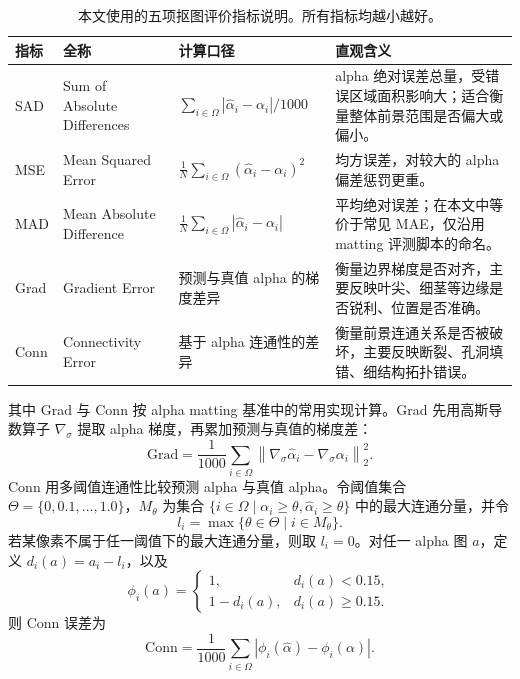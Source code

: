 \documentclass[supercite]{HustGraduPaper}
\begin{document}
	\begin{table}[ht]
		\centering
		\caption{本文使用的五项抠图评价指标说明。所有指标均越小越好。}
		\label{tab:metric_defs}
		\small
		\begin{tabularx}{\linewidth}{@{}llXX@{}}
			\toprule
			指标 & 全称 & 计算口径 & 直观含义 \\
			\midrule
			SAD & Sum of Absolute Differences & $\sum_{i\in\Omega}|\hat{\alpha}_i-\alpha_i|/1000$ & alpha 绝对误差总量，受错误区域面积影响大；适合衡量整体前景范围是否偏大或偏小。 \\
			MSE & Mean Squared Error & $\frac{1}{N}\sum_{i\in\Omega}(\hat{\alpha}_i-\alpha_i)^2$ & 均方误差，对较大的 alpha 偏差惩罚更重。 \\
			MAD & Mean Absolute Difference & $\frac{1}{N}\sum_{i\in\Omega}|\hat{\alpha}_i-\alpha_i|$ & 平均绝对误差；在本文中等价于常见 MAE，仅沿用 matting 评测脚本的命名。 \\
			Grad & Gradient Error & 预测与真值 alpha 的梯度差异 & 衡量边界梯度是否对齐，主要反映叶尖、细茎等边缘是否锐利、位置是否准确。 \\
			Conn & Connectivity Error & 基于 alpha 连通性的差异 & 衡量前景连通关系是否被破坏，主要反映断裂、孔洞填错、细结构拓扑错误。 \\
			\bottomrule
		\end{tabularx}
	\end{table}

	其中 Grad 与 Conn 按 alpha matting 基准中的常用实现计算。Grad 先用高斯导数算子 $\nabla_\sigma$ 提取 alpha 梯度，再累加预测与真值的梯度差：
	\begin{equation}
		\mathrm{Grad}=\frac{1}{1000}\sum_{i\in\Omega}
		\left\|\nabla_\sigma\hat{\alpha}_i-\nabla_\sigma\alpha_i\right\|_2^2 .
	\end{equation}
	Conn 用多阈值连通性比较预测 alpha 与真值 alpha。令阈值集合 $\Theta=\{0,0.1,\ldots,1.0\}$，$M_\theta$ 为集合 $\{i\in\Omega\mid \alpha_i\geq\theta,\hat{\alpha}_i\geq\theta\}$ 中的最大连通分量，并令
	\begin{equation}
		l_i=\max\{\theta\in\Theta\mid i\in M_\theta\}.
	\end{equation}
	若某像素不属于任一阈值下的最大连通分量，则取 $l_i=0$。对任一 alpha 图 $a$，定义 $d_i(a)=a_i-l_i$，以及
	\begin{equation}
		\phi_i(a)=
		\begin{cases}
			1, & d_i(a)<0.15,\\
			1-d_i(a), & d_i(a)\geq0.15.
		\end{cases}
	\end{equation}
	则 Conn 误差为
	\begin{equation}
		\mathrm{Conn}=\frac{1}{1000}\sum_{i\in\Omega}
		\left|\phi_i(\hat{\alpha})-\phi_i(\alpha)\right|.
	\end{equation}
\end{document}
